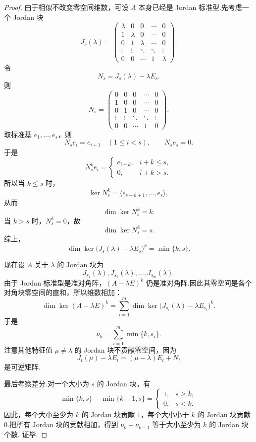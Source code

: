\begin{proof}
	由于相似不改变零空间维数，可设 $A$ 本身已经是 Jordan 标准型.先考虑一个 Jordan 块
	\[
	J_s(\lambda)=
	\begin{pmatrix}
		\lambda&0&0&\cdots&0\\
		1&\lambda&0&\cdots&0\\
		0&1&\lambda&\cdots&0\\
		\vdots&\vdots&\ddots&\ddots&\vdots\\
		0&0&\cdots&1&\lambda
	\end{pmatrix}.
	\]
	令
	\[
	N_s=J_s(\lambda)-\lambda E_s.
	\]
	则
	\[
	N_s=
	\begin{pmatrix}
		0&0&0&\cdots&0\\
		1&0&0&\cdots&0\\
		0&1&0&\cdots&0\\
		\vdots&\vdots&\ddots&\ddots&\vdots\\
		0&0&\cdots&1&0
	\end{pmatrix}.
	\]
	取标准基 $e_1,\ldots,e_s$，则
	\[
	N_s e_i=e_{i+1}\quad(1\leq i<s),\qquad N_s e_s=0.
	\]
	于是
	\[
	N_s^k e_i=
	\begin{cases}
		e_{i+k},& i+k\leq s,\\
		0,& i+k>s.
	\end{cases}
	\]
	所以当 $k\leq s$ 时，
	\[
	\ker N_s^k=\langle e_{s-k+1},\ldots,e_s\rangle,
	\]
	从而
	\[
	\dim\ker N_s^k=k.
	\]
	当 $k>s$ 时，$N_s^k=0$，故
	\[
	\dim\ker N_s^k=s.
	\]
	综上，
	\[
	\dim\ker\bigl(J_s(\lambda)-\lambda E_s\bigr)^k
	=
	\min\{k,s\}.
	\]
	
	现在设 $A$ 关于 $\lambda$ 的 Jordan 块为
	\[
	J_{s_1}(\lambda),J_{s_2}(\lambda),\ldots,J_{s_m}(\lambda).
	\]
	由于 Jordan 标准型是准对角阵，$(A-\lambda E)^k$ 仍是准对角阵.因此其零空间是各个对角块零空间的直和，所以维数相加：
	\[
	\dim\ker(A-\lambda E)^k
	=
	\sum_{i=1}^m
	\dim\ker\bigl(J_{s_i}(\lambda)-\lambda E_{s_i}\bigr)^k.
	\]
	于是
	\[
	\nu_k=\sum_{i=1}^m\min\{k,s_i\}.
	\]
	注意其他特征值 $\mu\neq\lambda$ 的 Jordan 块不贡献零空间，因为
	\[
	J_t(\mu)-\lambda E_t=(\mu-\lambda)E_t+N_t
	\]
	是可逆矩阵.
	
	最后考察差分.对一个大小为 $s$ 的 Jordan 块，有
	\[
	\min\{k,s\}-\min\{k-1,s\}
	=
	\begin{cases}
		1,&s\geq k,\\
		0,&s<k.
	\end{cases}
	\]
	因此，每个大小至少为 $k$ 的 Jordan 块贡献 $1$，每个大小小于 $k$ 的 Jordan 块贡献 $0$.把所有 Jordan 块的贡献相加，得到
$\nu_k-\nu_{k-1}$ 等于大小至少为 $k$ 的 Jordan 块个数.
	证毕.
	
\end{proof}

